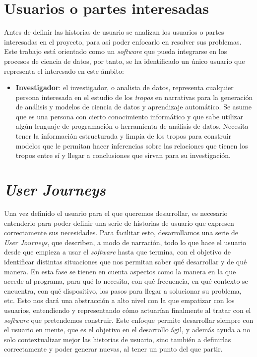 \section{Usuarios o partes interesadas}
Antes de definir las historias de usuario se analizan los usuarios o partes
interesadas en el proyecto, para así poder enfocarlo en resolver sus problemas.
Este trabajo está orientado como un \textit{software} que pueda integrarse en
los procesos de ciencia de datos, por tanto, se ha identificado un único usuario
que representa el interesado en este ámbito:
\begin{itemize}
    \item \textbf{Investigador}: el investigador, o analista de datos,
    representa cualquier persona interesada en el estudio de los \textit{tropos}
    en narrativas para la generación de análisis y modelos de ciencia de datos y
    aprendizaje automático. Se asume que es una persona con cierto conocimiento
    informático y que sabe utilizar algún lenguaje de programación o herramienta
    de análisis de datos. Necesita tener la información estructurada y limpia de
    los tropos para construir modelos que le permitan hacer inferencias sobre
    las relaciones que tienen los tropos entre sí y llegar a conclusiones que
    sirvan para su investigación.
\end{itemize}

\section{\textit{User Journeys}} 

Una vez definido el usuario para el que queremos desarrollar, es necesario
entenderlo para poder definir una serie de historias de usuario que expresen
correctamente sus necesidades. Para facilitar esto, desarrollamos una serie de
\textit{User Journeys}, que describen, a modo de narración, todo lo que hace el
usuario desde que empieza a usar el \textit{software} hasta que termina, con el
objetivo de identificar distintas situaciones que nos permitan saber qué
desarrollar y de qué manera. En esta fase se tienen en cuenta aspectos como la
manera en la que accede al programa, para qué lo necesita, con qué frecuencia,
en qué contexto se encuentra, con qué dispositivo, los pasos para llegar a
solucionar su problema, etc. Esto nos dará una abstracción a alto nivel con la
que empatizar con los usuarios, entendiendo y representando cómo actuarían
finalmente al tratar con el \textit{software} que pretendemos construir. Este
enfoque permite desarrollar siempre con el usuario en mente, que es el objetivo
en el desarrollo ágil, y además ayuda a no solo contextualizar mejor las
historias de usuario, sino también a definirlas correctamente y poder generar
nuevas, al tener un punto del que partir.

